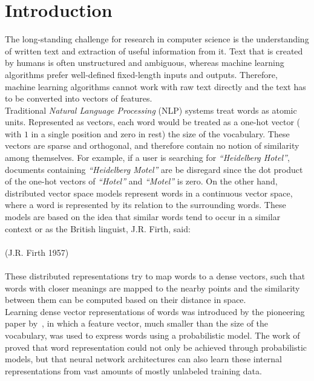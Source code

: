 \chapter{Introduction}\label{chap:intro}
The long-standing challenge for research in computer science is the understanding of written text and extraction of useful information from it. Text that is created by humans is often unstructured and ambiguous, whereas machine learning algorithms prefer well-defined fixed-length inputs and outputs. Therefore, machine learning algorithms cannot work with raw text directly and the text has to be converted into vectors of features.
\\
\noindent
Traditional \emph{Natural Language Processing} (NLP) systems treat words as atomic units. Represented as vectors, each word would be treated as a one-hot vector ( with $1$ in a single position and zero in rest) the size of the vocabulary. These vectors are sparse and orthogonal, and therefore contain no notion of similarity among themselves. For example, if a user is searching for \emph{``Heidelberg Hotel''}, documents containing \emph{``Heidelberg Motel''} are be disregard since the dot product of the one-hot vectors of \emph{``Hotel''} and \emph{``Motel''} is zero. On the other hand, distributed vector space models represent words in a continuous vector space, where a word is represented by its relation to the surrounding words. These models are based on the idea that similar words tend to occur in a similar context or as the British linguist, J.R. Firth, said:
\\
\\
\noindent
{} (J.R. Firth 1957)\\
\\
\noindent
These distributed representations try to map words to a dense vectors, such that words with closer meanings are mapped to the nearby points and the similarity between them can be computed based on their distance in space.
\\
\noindent 
Learning dense vector representations of words was introduced by the pioneering paper by~, in which a feature vector, much smaller than the size of the vocabulary, was used to express words using a probabilistic model. The work of~ proved that word representation could not only be achieved through probabilistic models, but that neural network architectures can also learn these internal representations from vast amounts of mostly unlabeled training data.\\
